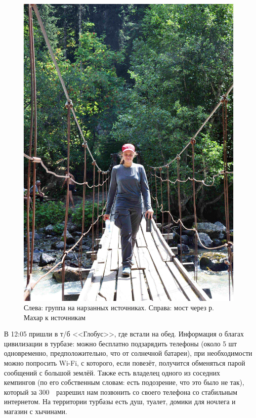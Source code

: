 \begin{figure}[h!]
\begin{minipage}[h]{0.35\linewidth}
		\includegraphics[width=\linewidth]{../pics/DSC_1098.jpg}
	\end{minipage}
	\caption{Слева: группа на нарзанных источниках. Справа: мост через р. Махар к источникам}
	\label{fig:DSC_1043}
\end{figure}

В 12:05 пришли в т/б <<Глобус>>, где встали на обед. Информация о благах цивилизации в турбазе: можно бесплатно подзарядить телефоны (около 5 шт одновременно, предположительно, что от солнечной батареи), при необходимости можно попросить Wi-Fi, с которого, если повезёт, получится обменяться парой сообщений с большой землёй. Также есть владелец одного из соседних кемпингов (по его собственным словам: есть подозрение, что это было не так), который за 300~\faRub~разрешил нам позвонить со своего телефона со стабильным интернетом. На территории турбазы есть душ, туалет, домики для ночлега и магазин с хычинами.

